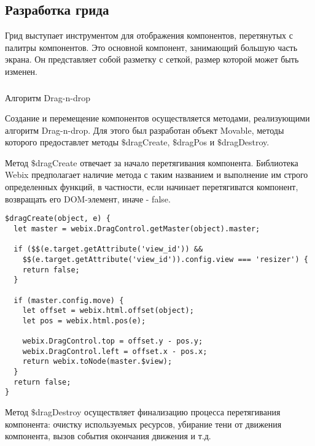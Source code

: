 \subsection{Разработка грида}
\label{sec:development:grid}

Грид выступает инструментом для отображения компонентов, перетянутых с палитры компонентов. Это основной компонент, занимающий большую часть экрана. Он представляет собой разметку с сеткой, размер которой может быть изменен.

\subsubsection{}Алгоритм Drag-n-drop
\

Создание и перемещение компонентов осуществляется методами, реализующими алгоритм Drag-n-drop. Для этого был разработан объект Movable, методы которого предоставлет методы $\$$dragCreate, $\$$dragPos и $\$$dragDestroy.

Метод $\$$dragCreate отвечает за начало перетягивания компонента. Библиотека Webix предполагает наличие метода с таким названием и выполнение им строго определенных функций, в частности, если начинает перетягиватся компонент, возвращать его DOM-элемент, иначе - false.

\begin{lstlisting}
$dragCreate(object, e) {
  let master = webix.DragControl.getMaster(object).master;

  if ($$(e.target.getAttribute('view_id')) &&
    $$(e.target.getAttribute('view_id')).config.view === 'resizer') {
    return false;
  }

  if (master.config.move) {
    let offset = webix.html.offset(object);
    let pos = webix.html.pos(e);

    webix.DragControl.top = offset.y - pos.y;
    webix.DragControl.left = offset.x - pos.x;
    return webix.toNode(master.$view);
  }
  return false;
}
\end{lstlisting}

Метод $\$$dragDestroy осуществляет финализацию процесса перетягивания компонента: очистку используемых ресурсов, убирание тени от движения компонента, вызов события окончания движения и т.д.

